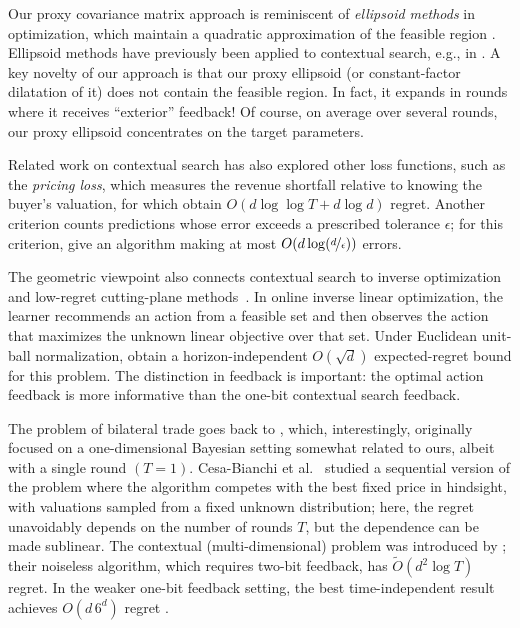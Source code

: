 \documentclass[11pt]{article}
\begin{document}
Our proxy covariance matrix approach is reminiscent of \textit{ellipsoid methods} in optimization, which maintain a quadratic approximation of the feasible region \cite{yudin1976informational,shor1977cut}. Ellipsoid methods have previously been applied to contextual search, e.g., in \cite{CLPL16,LPLV18,GGKMPS,GBCCP25}. A key novelty of our approach is that our proxy ellipsoid (or constant-factor dilatation of it) does not contain the feasible region. In fact, it expands in rounds where it receives ``exterior'' feedback! Of course, on average over several rounds, our proxy ellipsoid concentrates on the target parameters. 

{Related work on contextual search has} also explored other loss functions, such as the \textit{pricing loss}, which measures the revenue shortfall relative to knowing the buyer's valuation{, for which} \cite{LPS21} obtain $O(d\log\log T+d\log d)$ regret. {Another criterion counts predictions whose error exceeds a prescribed tolerance} $\epsilon${; for this criterion,} \cite{LPLV18} give an algorithm making at most $O(d\log(\nicefrac{d}{\epsilon}))$ errors. 

The geometric viewpoint also connects contextual search to inverse optimization and low-regret cutting-plane methods~\cite{Barmann17,GGKMPS,Besbes25,SakaueONS}. In online inverse linear optimization, the learner recommends an action from a feasible set and then observes the action that maximizes the unknown linear objective over that set. Under Euclidean unit-ball normalization, \cite{Sakaue26,gupta2026optimal} obtain a horizon-independent $O(\sqrt d)$ expected-regret bound for this problem. The distinction in feedback is important: the optimal action feedback is more informative than the one-bit contextual search feedback. 


The problem of bilateral trade goes back to \cite{MS83}, which, interestingly, originally focused on a one-dimensional Bayesian setting somewhat related to ours, albeit with a single round $(T=1)$. Cesa-Bianchi et al.~\cite{CCCFL21,Cesa-BianchiCCF24} studied a sequential version of the problem where the algorithm competes with the best fixed price in hindsight, with valuations sampled from a fixed unknown distribution; here, the regret unavoidably depends on the number of rounds $T$, but the dependence can be made sublinear. The contextual (multi-dimensional) problem was introduced by \cite{GBCCP25}; their noiseless algorithm, which requires two-bit feedback, has $\tilde O(d^2\log T)$ regret. In the weaker one-bit feedback setting, the best time-independent result achieves $O(d\,6^d)$ regret \cite{CFGLPR26}. 
\end{document}

